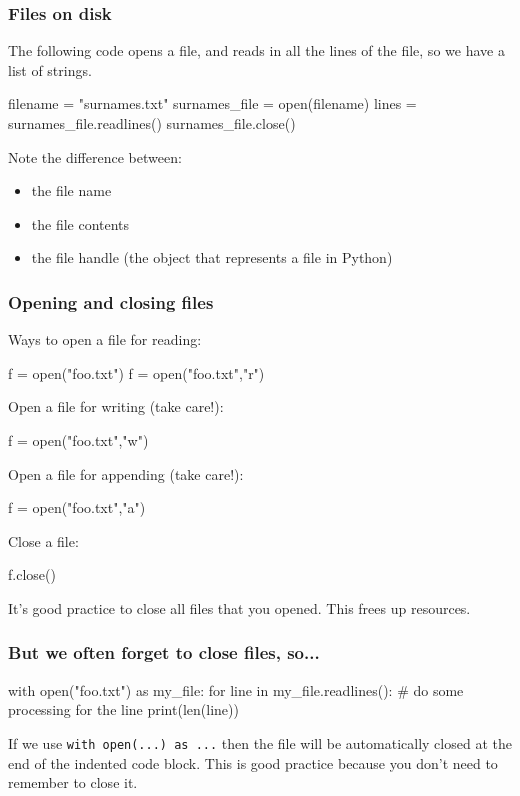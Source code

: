 \documentclass{beamer}
\begin{document}
\begin{frame}[fragile]
\frametitle{Files on disk}
The following code opens a file, and reads in all the lines of the file, so we have a list of strings. 
\begin{code}
filename = "surnames.txt"
surnames_file = open(filename)
lines = surnames_file.readlines()
surnames_file.close()
\end{code}
Note the difference between:
\begin{itemize}
\item the file name
\item the file contents
\item the file handle (the object that represents a file in Python)
\end{itemize}
\end{frame}

\begin{frame}[fragile]
\frametitle{Opening and closing files}
Ways to open a file for reading:
\begin{code}
f = open("foo.txt")
f = open("foo.txt","r")
\end{code}

Open a file for writing (take care!):
\begin{code}
f = open("foo.txt","w")
\end{code}

Open a file for appending (take care!):
\begin{code}
f = open("foo.txt","a")
\end{code}

Close a file:
\begin{code}
f.close() 
\end{code}
It's good practice to close all files that you opened. This frees up resources.
\end{frame}

\begin{frame}[fragile]
\frametitle{But we often forget to close files, so...}
\begin{code}
with open("foo.txt") as my_file:
   for line in my_file.readlines():
      # do some processing for the line
      print(len(line)) 
\end{code}
If we use \lstinline{with open(...) as ...} then the file will be automatically closed at the end of the indented code block. 
This is good practice because you don't need to remember to close it.
\end{frame}
\end{document}
